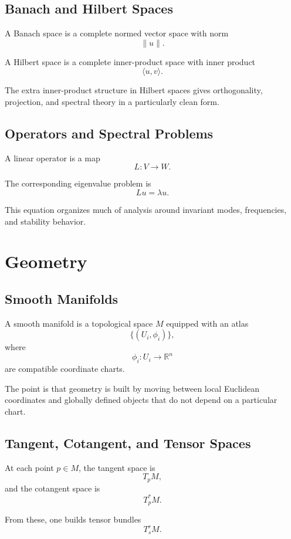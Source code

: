 \documentclass[11pt]{article}
\newcommand{\R}{\mathbb{R}}
\begin{document}
\subsection{Banach and Hilbert Spaces}

A Banach space is a complete normed vector space with norm
\[
  \|u\|.
\]

A Hilbert space is a complete inner-product space with inner product
\[
  \langle u,v \rangle.
\]

The extra inner-product structure in Hilbert spaces gives orthogonality,
projection, and spectral theory in a particularly clean form.

\subsection{Operators and Spectral Problems}

A linear operator is a map
\[
  L : V \to W.
\]

The corresponding eigenvalue problem is
\[
  Lu = \lambda u.
\]

This equation organizes much of analysis around invariant modes, frequencies,
and stability behavior.

\section{Geometry}

\subsection{Smooth Manifolds}

A smooth manifold is a topological space \(M\) equipped with an atlas
\[
  \{(U_i,\phi_i)\},
\]
where
\[
  \phi_i : U_i \to \R^n
\]
are compatible coordinate charts.

The point is that geometry is built by moving between local Euclidean
coordinates and globally defined objects that do not depend on a particular
chart.

\subsection{Tangent, Cotangent, and Tensor Spaces}

At each point \(p \in M\), the tangent space is
\[
  T_p M,
\]
and the cotangent space is
\[
  T_p^* M.
\]

From these, one builds tensor bundles
\[
  T^r_s M.
\]
\end{document}
